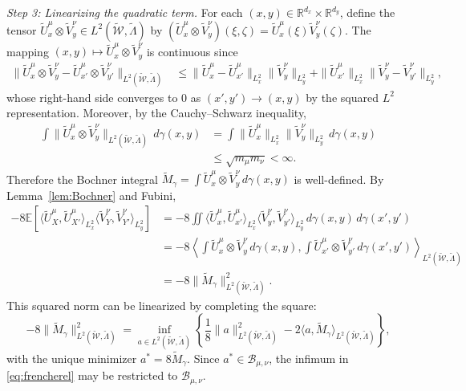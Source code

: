 \documentclass[11pt]{amsart}
\theoremstyle{definition}
\theoremstyle{remark}
\newcommand{\R}{\mathbb{R}}
\newcommand{\E}{\mathbb{E}}
\newcommand{\1}{\mathbf{1}}
\numberwithin{equation}{section}
\begin{document}
\emph{Step 3: Linearizing the quadratic term.}
For each $(x,y)\in\R^{d_x}\times\R^{d_y}$, define the tensor
$\widetilde U_x^\mu\otimes \widetilde V_y^\nu\in L^2(\widetilde{\mathcal W},\widetilde\Lambda)$ by
$(\widetilde U_x^\mu\otimes \widetilde V_y^\nu)(\xi,\zeta)
=
\widetilde U_x^\mu(\xi)\widetilde V_y^\nu(\zeta)$.
The mapping $(x,y)\mapsto \widetilde U_x^\mu\otimes \widetilde V_y^\nu$ is continuous since
\begin{equation} \label{eq:tensor-bound}
\begin{aligned}
\|\widetilde U_x^\mu\otimes \widetilde V_y^\nu
-\widetilde U_{x'}^\mu\otimes \widetilde V_{y'}^\nu\|_{L^2(\widetilde{\mathcal W},\widetilde\Lambda)}
&\leq
\|\widetilde U_x^\mu-\widetilde U_{x'}^\mu\|_{L^2_x}\|\widetilde V_y^\nu\|_{L^2_y}+
\|\widetilde U_{x'}^\mu\|_{L^2_x}
\|\widetilde V_y^\nu-\widetilde V_{y'}^\nu\|_{L^2_y},
\end{aligned}
\end{equation}
whose right-hand side converges to $0$ as $(x',y')\to(x,y)$ by the
squared $L^2$ representation. Moreover, by the Cauchy--Schwarz inequality,
\begin{align*}
\int
\|\widetilde U_x^\mu\otimes \widetilde V_y^\nu\|_{L^2(\widetilde{\mathcal W},\widetilde\Lambda)}
\,d\gamma(x,y)
&=
\int
\|\widetilde U_x^\mu\|_{L^2_x}\|\widetilde V_y^\nu\|_{L^2_y}
\,d\gamma(x,y)\\
&\leq
\sqrt{m_\mu m_\nu}
<\infty.
\end{align*}
Therefore the Bochner integral $\widetilde M_\gamma
=\int
\widetilde U_x^\mu\otimes \widetilde V_y^\nu\,d\gamma(x,y)$ is well-defined. By Lemma~\ref{lem:Bochner} and Fubini,
\begin{align*}
-8\E\left[
\langle \widetilde U_X^\mu,\widetilde U_{X'}^\mu\rangle_{L^2_x}
\langle \widetilde V_Y^\nu,\widetilde V_{Y'}^\nu\rangle_{L^2_y}
\right]
&=
-8\iint
\langle \widetilde U_x^\mu,\widetilde U_{x'}^\mu\rangle_{L^2_x}
\langle \widetilde V_y^\nu,\widetilde V_{y'}^\nu\rangle_{L^2_y}
\,d\gamma(x,y)\,d\gamma(x',y')\\
&=
-8\left\langle
\int \widetilde U_x^\mu\otimes \widetilde V_y^\nu\,d\gamma(x,y),
\int \widetilde U_{x'}^\mu\otimes \widetilde V_{y'}^\nu\,d\gamma(x',y')
\right\rangle_{L^2(\widetilde{\mathcal W},\widetilde\Lambda)}\\
&=
-8\|\widetilde M_\gamma\|_{L^2(\widetilde{\mathcal W},\widetilde\Lambda)}^2.
\end{align*}
This squared norm can be linearized by completing the square:
\begin{equation}\label{eq:frencherel}
-8\|\widetilde M_\gamma\|_{L^2(\widetilde{\mathcal W},\widetilde\Lambda)}^2
=
\inf_{a\in L^2(\widetilde{\mathcal W},\widetilde\Lambda)}
\left\{
\frac18\|a\|_{L^2(\widetilde{\mathcal W},\widetilde\Lambda)}^2
-
2\langle a,\widetilde M_\gamma\rangle_{L^2(\widetilde{\mathcal W},\widetilde\Lambda)}
\right\},
\end{equation}
with the unique minimizer $a^*=8\widetilde M_\gamma$. 
Since $a^*\in\mathcal B_{\mu,\nu}$, the infimum in \eqref{eq:frencherel} may be
restricted to $\mathcal B_{\mu,\nu}$.
\end{document}
